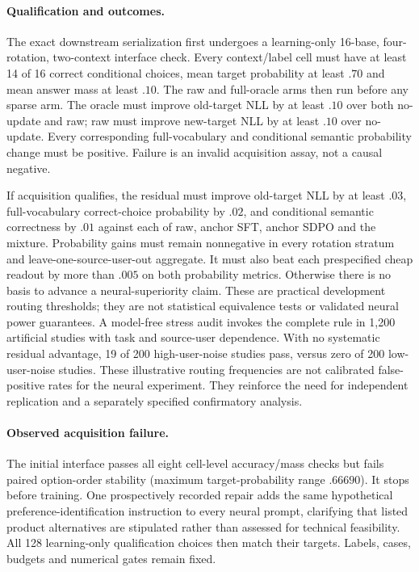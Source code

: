 \documentclass{article}
\begin{document}
\paragraph{Qualification and outcomes.}
The exact downstream serialization first undergoes a learning-only
16-base, four-rotation, two-context interface check. Every context/label cell
must have at least 14 of 16 correct conditional choices, mean target probability
at least $.70$ and mean answer mass at least $.10$. The raw and full-oracle arms
then run before any sparse arm. The oracle must improve old-target NLL by at
least $.10$ over both no-update and raw; raw must improve new-target NLL by at
least $.10$ over no-update. Every corresponding full-vocabulary and conditional
semantic probability change must be positive. Failure is an invalid acquisition
assay, not a causal negative.

If acquisition qualifies, the residual must improve old-target NLL by at least
$.03$, full-vocabulary correct-choice probability by $.02$, and conditional
semantic correctness by $.01$ against each of raw, anchor SFT, anchor SDPO and
the mixture. Probability gains must remain nonnegative in every rotation
stratum and leave-one-source-user-out aggregate. It must also beat each
prespecified cheap readout by more than $.005$ on both probability metrics.
Otherwise there is no basis to advance a neural-superiority claim. These are
practical development routing thresholds; they are not statistical equivalence
tests or validated neural power guarantees. A model-free stress audit invokes
the complete rule in 1,200 artificial studies with task and source-user
dependence. With no systematic residual advantage, 19 of 200 high-user-noise
studies pass, versus zero of 200 low-user-noise studies. These illustrative
routing frequencies are not calibrated false-positive rates for the neural
experiment. They reinforce the need for independent replication and a separately
specified confirmatory analysis.

\paragraph{Observed acquisition failure.}
The initial interface passes all eight cell-level accuracy/mass checks but
fails paired option-order stability (maximum target-probability range $.66690$).
It stops before training. One prospectively recorded repair adds the same
hypothetical preference-identification instruction to every neural prompt,
clarifying that listed product alternatives are stipulated rather than assessed
for technical feasibility. All 128 learning-only qualification choices then
match their targets. Labels, cases, budgets and numerical gates remain fixed.
\end{document}
